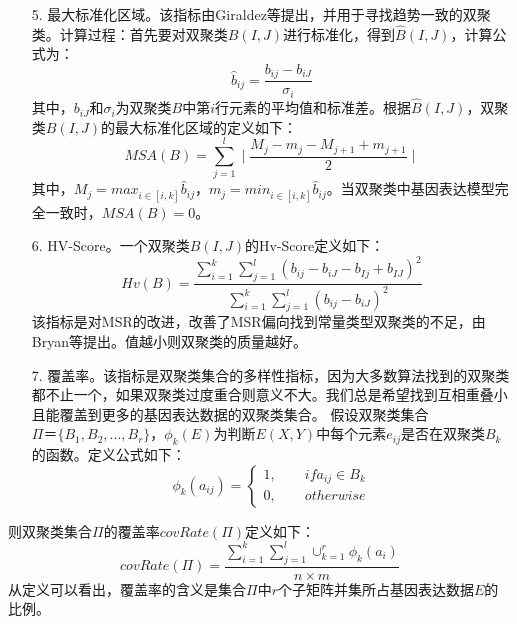 \begin{enumerate}
    \item[5.] 最大标准化区域。该指标由Giraldez\cite{giraldez2007evolutionary}等提出，并用于寻找趋势一致的双聚类。计算过程：首先要对双聚类$B(I,J)$进行标准化，得到$\hat{B}(I,J)$，计算公式为：
    \begin{equation}
      \hat{b}_{ij} = \frac{b_{ij}-b_{iJ}}{\sigma_i}
    \end{equation}
    \hspace{2em} 其中，$b_{iJ}$和$\sigma_i$为双聚类$B$中第$i$行元素的平均值和标准差。根据$\hat{B}(I,J)$，双聚类$B(I,J)$的最大标准化区域的定义如下：
    \begin{equation}
      MSA(B) = \sum_{j=1}^l \mid \frac{M_j-m_j-M_{j+1}+m_{j+1}}{2}\mid
    \end{equation}
    \hspace{2em} 其中，$M_j=max_{i\in [i,k]}\hat{b}_{ij}$，$m_j=min_{i\in [i,k]}\hat{b}_{ij}$。当双聚类中基因表达模型完全一致时，$MSA(B)=0$。

    \item[6.] HV-Score。一个双聚类$B(I, J)$的Hv-Score定义如下：
    \begin{equation}
     Hv(B) = \frac{\sum_{i=1}^k \sum_{j=1}^l(b_{ij}-b_{iJ}-b_{Ij}+b_{IJ})^2}{\sum_{i=1}^k \sum_{j=1}^l(b_{ij}-b_{iJ})^2}
    \end{equation}
    该指标是对MSR的改进，改善了MSR偏向找到常量类型双聚类的不足，由Bryan等提出。值越小则双聚类的质量越好。

    \item[7.] 覆盖率。该指标是双聚类集合的多样性指标，因为大多数算法找到的双聚类都不止一个，如果双聚类过度重合则意义不大。我们总是希望找到互相重叠小且能覆盖到更多的基因表达数据的双聚类集合。 假设双聚类集合$\Pi＝\{B_1,B_2,...,B_r\}$，$\phi_k(E)$为判断$E(X,Y)$中每个元素$e_{ij}$是否在双聚类$B_k$的函数。定义公式如下：
    \begin{equation}
    \phi_k(a_{ij})  = \left\{
      \begin{aligned}
       1 ,\hspace{2em}  if a_{ij} \in B_k \\
       0 ,\hspace{2em}  otherwise 
      \end{aligned}
    \right.
    \end{equation}
  \end{enumerate}
  \hspace{2em}则双聚类集合$\Pi$的覆盖率$covRate(\Pi)$定义如下：
  \begin{equation}
   covRate(\Pi) = \frac{\sum_{i=1}^k\sum_{j=1}^l\cup_{k=1}^r\phi_k(a_i)}{n \times m} 
  \end{equation}
  \hspace{2em}从定义可以看出，覆盖率的含义是集合$\Pi$中$r$个子矩阵并集所占基因表达数据$E$的比例。

